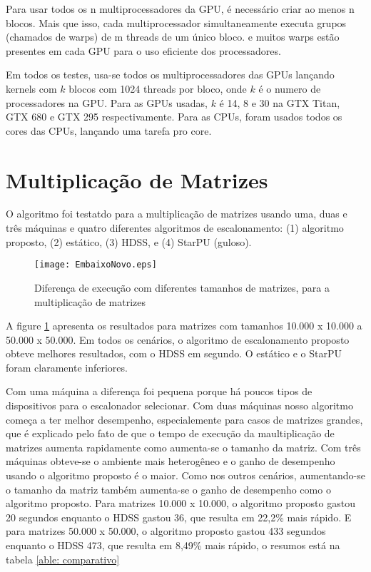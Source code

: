 Para usar todos os n multiprocessadores da GPU, é necessário criar ao menos n blocos. Mais que isso, cada multiprocessador simultaneamente executa grupos (chamados de warps) de m threads de um único bloco. e muitos warps estão presentes em cada GPU para o uso eficiente dos processadores.

Em todos os testes, usa-se todos os multiprocessadores das GPUs lançando kernels com $k$ blocos com 1024 threads por bloco, onde $k$ é o numero de processadores na GPU. Para as GPUs usadas, $k$ é 14, 8 e 30 na GTX Titan, GTX 680 e GTX 295 respectivamente. Para as CPUs, foram usados todos os cores das CPUs, lançando uma tarefa pro core.

 \section{Multiplicação de Matrizes}

O algoritmo foi testatdo para a multiplicação de matrizes usando uma, duas e três máquinas e quatro diferentes algoritmos de escalonamento: (1) algoritmo proposto, (2) estático, (3) HDSS, e (4) StarPU (guloso).

\begin{figure}[htb]
	\begin{center}
	\centering
			\texttt{[image: EmbaixoNovo.eps]}
	\caption{Diferença de execução com diferentes tamanhos de matrizes, para a multiplicação de matrizes}
	\label{fig:todosJuntos}
	\end{center}
\end{figure}

A figure \ref{fig:todosJuntos} apresenta os resultados para matrizes com tamanhos 10.000 x 10.000 a 50.000 x 50.000. Em todos os cenários, o algoritmo de escalonamento proposto obteve melhores resultados, com o HDSS em segundo. O estático e o StarPU foram claramente inferiores.

Com uma máquina a diferença foi pequena porque há poucos tipos de dispositivos para o escalonador selecionar. Com duas máquinas nosso algoritmo começa a ter melhor desempenho, especialemente para casos de matrizes grandes, que é explicado pelo fato de que o tempo de execução da maultiplicação de matrizes aumenta rapidamente como aumenta-se o tamanho da matriz. Com três máquinas obteve-se o ambiente mais heterogêneo e o ganho de desempenho usando o algoritmo proposto é o maior. Como nos outros cenários, aumentando-se o tamanho da matriz também aumenta-se o ganho de desempenho como o algoritmo proposto. Para matrizes 10.000 x 10.000, o algoritmo proposto gastou 20 segundos enquanto o HDSS gastou 36, que resulta em 22,2\% mais rápido. E para matrizes 50.000 x 50.000, o algoritmo proposto gastou 433 segundos enquanto o HDSS 473, que resulta em 8,49\% mais rápido, o resumos está na tabela \ref{able: comparativo}

